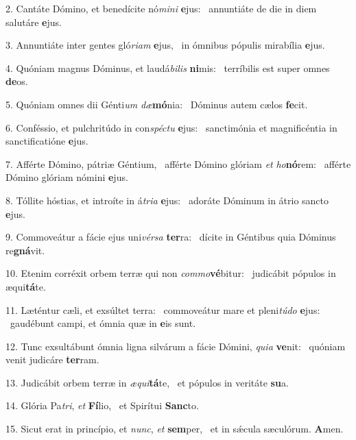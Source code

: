 2. Cantáte Dómino, et benedícite nó\textit{mi}\textit{ni} \textbf{e}jus: \ast\  annuntiáte de die in diem salutáre \textbf{e}jus.\

3. Annuntiáte inter gentes gló\textit{ri}\textit{am} \textbf{e}jus, \ast\  in ómnibus pópulis mirabília \textbf{e}jus.\

4. Quóniam magnus Dóminus, et laudá\textit{bi}\textit{lis} \textbf{ni}mis: \ast\  terríbilis est super omnes \textbf{de}os.\

5. Quóniam omnes dii Génti\textit{um} \textit{dæ}\textbf{mó}nia: \ast\  Dóminus autem cælos \textbf{fe}cit.\

6. Conféssio, et pulchritúdo in con\textit{spéc}\textit{tu} \textbf{e}jus: \ast\  sanctimónia et magnificéntia in sanctificatióne \textbf{e}jus.\

7. Afférte Dómino, pátriæ Géntium, \dag\  afférte Dómino glóriam \textit{et} \textit{ho}\textbf{nó}rem: \ast\  afférte Dómino glóriam nómini \textbf{e}jus.\

8. Tóllite hóstias, et introíte in á\textit{tri}\textit{a} \textbf{e}jus: \ast\  adoráte Dóminum in átrio sancto \textbf{e}jus.\

9. Commoveátur a fácie ejus uni\textit{vér}\textit{sa} \textbf{ter}ra: \ast\  dícite in Géntibus quia Dóminus re\textbf{gná}vit.\

10. Etenim corréxit orbem terræ qui non \textit{com}\textit{mo}\textbf{vé}bitur: \ast\  judicábit pópulos in æqui\textbf{tá}te.\

11. Læténtur cæli, et exsúltet terra: \dag\  commoveátur mare et pleni\textit{tú}\textit{do} \textbf{e}jus: \ast\  gaudébunt campi, et ómnia quæ in \textbf{e}is sunt.\

12. Tunc exsultábunt ómnia ligna silvárum a fácie Dómini, \textit{qui}\textit{a} \textbf{ve}nit: \ast\  quóniam venit judicáre \textbf{ter}ram.\

13. Judicábit orbem terræ in \textit{æ}\textit{qui}\textbf{tá}te, \ast\  et pópulos in veritáte \textbf{su}a.\

14. Glória Pa\textit{tri}, \textit{et} \textbf{Fí}lio, \ast\  et Spirítui \textbf{Sanc}to.\

15. Sicut erat in princípio, et \textit{nunc}, \textit{et} \textbf{sem}per, \ast\  et in sǽcula sæculórum. \textbf{A}men.\

